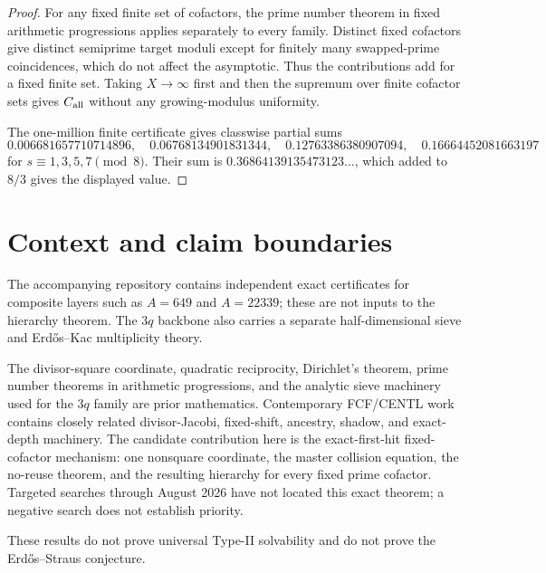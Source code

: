 \documentclass[11pt]{article}
\theoremstyle{definition}
\begin{document}
\begin{proof}
For any fixed finite set of cofactors, the prime number theorem in fixed arithmetic progressions applies separately to every family. Distinct fixed cofactors give distinct semiprime target moduli except for finitely many swapped-prime coincidences, which do not affect the asymptotic. Thus the contributions add for a fixed finite set. Taking $X\to\infty$ first and then the supremum over finite cofactor sets gives $C_{\rm all}$ without any growing-modulus uniformity.

The one-million finite certificate gives classwise partial sums
\[
0.006681657710714896,\quad
0.06768134901831344,\quad
0.12763386380907094,\quad
0.16664452081663197
\]
for $s\equiv1,3,5,7\pmod8$. Their sum is $0.36864139135473123\ldots$, which added to $8/3$ gives the displayed value.
\end{proof}

\section{Context and claim boundaries}
The accompanying repository contains independent exact certificates for composite layers such as $A=649$ and $A=22339$; these are not inputs to the hierarchy theorem. The $3q$ backbone also carries a separate half-dimensional sieve and Erd\H{o}s--Kac multiplicity theory.

The divisor-square coordinate, quadratic reciprocity, Dirichlet's theorem, prime number theorems in arithmetic progressions, and the analytic sieve machinery used for the $3q$ family are prior mathematics. Contemporary FCF/CENTL work contains closely related divisor-Jacobi, fixed-shift, ancestry, shadow, and exact-depth machinery. The candidate contribution here is the exact-first-hit fixed-cofactor mechanism: one nonsquare coordinate, the master collision equation, the no-reuse theorem, and the resulting hierarchy for every fixed prime cofactor. Targeted searches through August 2026 have not located this exact theorem; a negative search does not establish priority.

These results do not prove universal Type-II solvability and do not prove the Erd\H{o}s--Straus conjecture.
\end{document}
